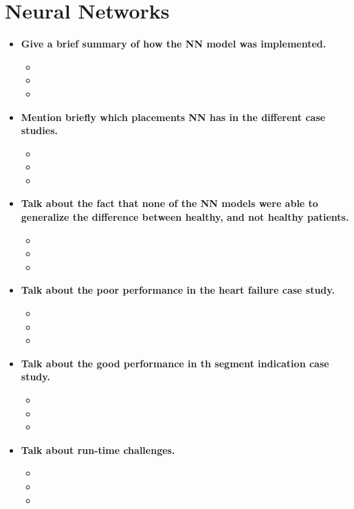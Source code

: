 \section{Neural Networks}

\begin{itemize}
    \item \textbf{Give a brief summary of how the NN model was implemented.}
    \begin{itemize}
        \item 
        \item 
        \item 
    \end{itemize}
    \item \textbf{Mention briefly which placements NN has in the different case studies.}
    \begin{itemize}
        \item 
        \item 
        \item 
    \end{itemize}
    \item \textbf{Talk about the fact that none of the NN models were able to generalize the difference between healthy, and not healthy patients.}
    \begin{itemize}
        \item 
        \item 
        \item 
    \end{itemize}
    \item \textbf{Talk about the poor performance in the heart failure case study.}
    \begin{itemize}
        \item 
        \item 
        \item 
    \end{itemize}
    \item \textbf{Talk about the good performance in th segment indication case study.}
    \begin{itemize}
        \item 
        \item 
        \item 
    \end{itemize}
    \item \textbf{Talk about run-time challenges.}
    \begin{itemize}
        \item 
        \item 
        \item 
    \end{itemize}
\end{itemize}

